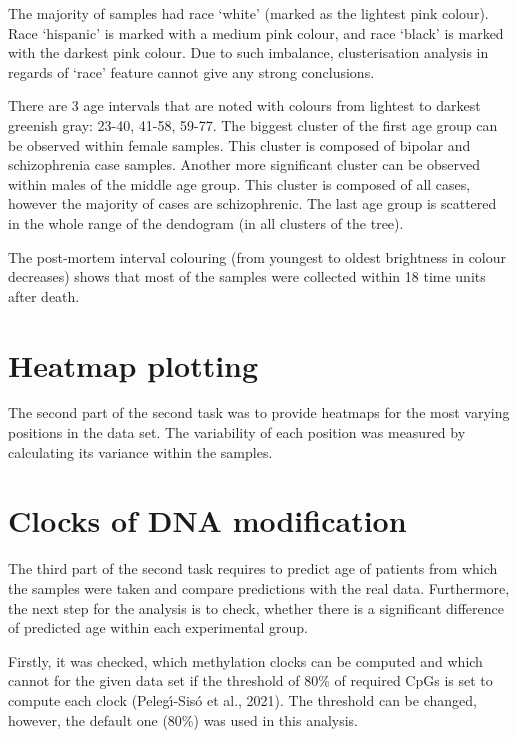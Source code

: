 \documentclass[
]{article}
\begin{document}
The majority of samples had race `white' (marked as the lightest pink
colour). Race `hispanic' is marked with a medium pink colour, and race
`black' is marked with the darkest pink colour. Due to such imbalance,
clusterisation analysis in regards of `race' feature cannot give any
strong conclusions.

There are 3 age intervals that are noted with colours from lightest to
darkest greenish gray: 23-40, 41-58, 59-77. The biggest cluster of the
first age group can be observed within female samples. This cluster is
composed of bipolar and schizophrenia case samples. Another more
significant cluster can be observed within males of the middle age
group. This cluster is composed of all cases, however the majority of
cases are schizophrenic. The last age group is scattered in the whole
range of the dendogram (in all clusters of the tree).

The post-mortem interval colouring (from youngest to oldest brightness
in colour decreases) shows that most of the samples were collected
within 18 time units after death.

\hypertarget{heatmap-plotting}{%
\section{Heatmap plotting}\label{heatmap-plotting}}

The second part of the second task was to provide heatmaps for the most
varying positions in the data set. The variability of each position was
measured by calculating its variance within the samples.

\hypertarget{clocks-of-dna-modification}{%
\section{Clocks of DNA modification}\label{clocks-of-dna-modification}}

The third part of the second task requires to predict age of patients
from which the samples were taken and compare predictions with the real
data. Furthermore, the next step for the analysis is to check, whether
there is a significant difference of predicted age within each
experimental group.

Firstly, it was checked, which methylation clocks can be computed and
which cannot for the given data set if the threshold of 80\% of required
CpGs is set to compute each clock (Pelegı́-Sisó et al., 2021). The
threshold can be changed, however, the default one (80\%) was used in
this analysis.
\end{document}
